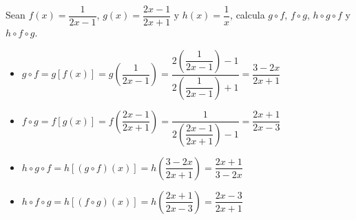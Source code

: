 \vspace{1cm}

\begin{ex}
	Sean $f(x)=\dfrac{1}{2x-1}$, $g(x)=\dfrac{2x-1}{2x+1} \text{ y } h(x)=\dfrac{1}{x}$, calcula $g \circ f$, $f \circ g$, $h \circ g \circ f$ y $h \circ f \circ g$.
	\begin{sol}
		\begin{itemize}
			\item $g \circ f = g[f(x)] = g(\dfrac{1}{2x-1}) = \dfrac{2(\dfrac{1}{2x-1})-1}{2(\dfrac{1}{2x-1})+1} = \dfrac{3-2x}{2x+1}$
			\item $f \circ g = f[g(x)] = f(\dfrac{2x-1}{2x+1}) =\dfrac{1}{2(\dfrac{2x-1}{2x+1})-1} = \dfrac{2x+1}{2x-3}$
			\item $h \circ g \circ f= h[(g \circ f)(x)] = h(\dfrac{3-2x}{2x+1}) = \dfrac{2x+1}{3-2x}$
			\item $h \circ f \circ g= h[(f \circ g)(x)] = h(\dfrac{2x+1}{2x-3}) = \dfrac{2x-3}{2x+1}$
		\end{itemize}
	\end{sol}
\end{ex}


